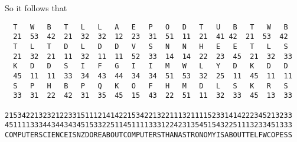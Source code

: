 \documentclass[a4paper,12pt]{article}
\begin{document}
\begin{enumerate}
\begin{center}
So it follows that

\begin{verbatim}
  T   W   B   T   L   L   A   E   P   O   D   T   U   B   T   W   B 
  21  53  42  21  32  32  12  23  31  51  11  21  41 42  21  53  42
  T   L   T   D   L   D   D   V   S   N   N   H   E   E   T   L   S
  21  32  21  11  32  11  11  52  33  14  14  22  23  45  21  32  33
  K   D   D   S   I   F   G   I   I   M   W   L   Y   D   K   D   D
  45  11  11  33  34  43  44  34  34  51  53  32  25  11  45  11  11
  S   P   H   B   P   Q   K   O   F   H   M   D   L   S   K   R   S
  33  31  22  42  31  35  45  15  43  22  51  11  32  33  45  13  33

21534221323212233151112141422153422132211132111152331414222345213233
45111133344344343451533225114511113331224231354515432251113233451333
COMPUTERSCIENCEISNZDOREABOUTCOMPUTERSTHANASTRONOMYISABOUTTELFWCOPESS
\end{verbatim}


\end{center}

\end{enumerate}
\end{document}
